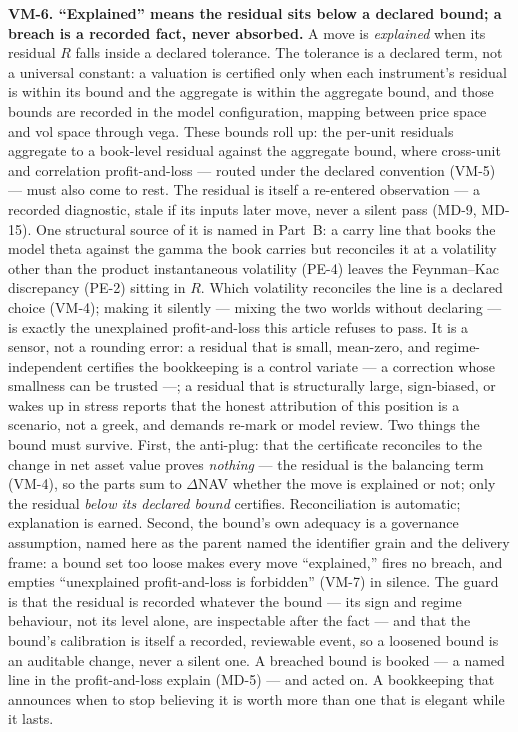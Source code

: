 \documentclass[11pt,a4paper]{article}
\newcommand{\vlabel}[1]{\leavevmode\hypertarget{vm-#1}{}%
  \marginpar{\raggedright\scriptsize\ttfamily\textcolor{gray}{#1}}}
\newcommand{\trace}[1]{\par\smallskip{\small\itshape (#1)}}
\begin{document}
\vlabel{VM-6}\textbf{VM-6. ``Explained'' means the residual sits below a
declared bound; a breach is a recorded fact, never absorbed.} A move is
\emph{explained} when its residual $R$ falls inside a declared tolerance.
The tolerance is a declared term, not a universal constant: a valuation is
certified only when each instrument's residual is within its bound and the
aggregate is within the aggregate bound, and those bounds are recorded in
the model configuration, mapping between price space and vol space through
vega. These bounds roll up: the per-unit residuals aggregate to a
book-level residual against the aggregate bound, where cross-unit and
correlation profit-and-loss --- routed under the declared convention
(VM-5) --- must also come to rest. The residual is itself a re-entered
observation --- a recorded
diagnostic, stale if its inputs later move, never a silent pass (MD-9,
MD-15). One structural source of it is named in Part~B: a carry line that
books the model theta against the gamma the book carries but reconciles it at a
volatility other than the product instantaneous volatility (PE-4) leaves the
Feynman--Kac discrepancy (PE-2) sitting in $R$. Which volatility reconciles the
line is a declared choice (VM-4); making it silently --- mixing the two worlds
without declaring --- is exactly the unexplained profit-and-loss this article
refuses to pass. It is a sensor, not a rounding error: a residual that is small,
mean-zero, and regime-independent certifies the bookkeeping is a control
variate --- a correction whose smallness can be trusted ---; a residual
that is structurally large, sign-biased, or wakes up
in stress reports that the honest attribution of this position is a
scenario, not a greek, and demands re-mark or model review. Two things the
bound must survive. First, the anti-plug: that the certificate reconciles
to the change in net asset value proves \emph{nothing} --- the residual is
the balancing term (VM-4), so the parts sum to $\Delta$NAV whether the move
is explained or not; only the residual \emph{below its declared bound}
certifies. Reconciliation is automatic; explanation is earned. Second, the
bound's own adequacy is a governance assumption, named here as the parent
named the identifier grain and the delivery frame: a bound set too loose
makes every move ``explained,'' fires no breach, and empties ``unexplained
profit-and-loss is forbidden'' (VM-7) in silence. The guard is that the
residual is recorded whatever the bound --- its sign and regime behaviour,
not its level alone, are inspectable after the fact --- and that the bound's
calibration is itself a recorded, reviewable event, so a loosened bound is
an auditable change, never a silent one. A breached
bound is booked --- a named line in the profit-and-loss explain (MD-5) ---
and acted on. A bookkeeping that announces when to stop believing it is
worth more than one that is elegant while it lasts.
\trace{Correctness, Auditability; C-2.4, C-13.2, MD-9, MD-15.}
\end{document}
